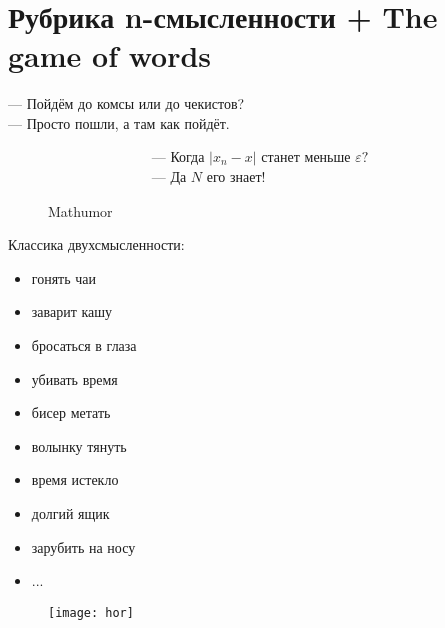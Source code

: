 \section{Рубрика n-смысленности + The game of words}
\begin{epigraph}
    --- Пойдём до комсы или до чекистов?\\
    --- Просто пошли, а там как пойдёт.
\end{epigraph}

\begin{figure}[ht!]
    \centering
    \[
        \begin{array}{l}
            \text{--- Когда } |x_n - x| \text{ станет меньше } \varepsilon?\\
            \text{--- Да } N \text{ его знает}!
        \end{array}
    \]
    \caption{Mathumor}
\end{figure}

Классика двухсмысленности:
\begin{itemize}
    \item гонять чаи
    \item заварит кашу
    \item бросаться в глаза
    \item убивать время
    \item бисер метать
    \item волынку тянуть
    \item время истекло
    \item долгий ящик
    \item зарубить на носу
    \item ...
\end{itemize}

\begin{figure}[ht!]
    \centering
    \texttt{[image: hor]}
\end{figure}

\begin{flushright}
\end{flushright}

